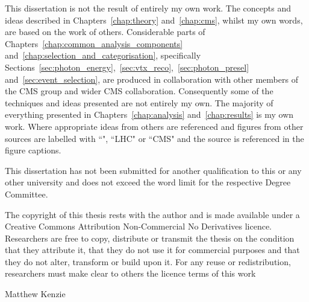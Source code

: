 \begin{declaration}
  This dissertation is not the result of entirely my own work. The concepts and ideas described in Chapters~\ref{chap:theory} and~\ref{chap:cms}, whilst my own words, are based on the work of others. Considerable parts of Chapters~\ref{chap:common_analysis_components} and~\ref{chap:selection_and_categorisation}, specifically Sections~\ref{sec:photon_energy},~\ref{sec:vtx_reco},~\ref{sec:photon_presel} and~\ref{sec:event_selection}, are produced in collaboration with other members of the \acs{CMS} \Hgg group and wider \acs{CMS} collaboration. Consequently some of the techniques and ideas presented are not entirely my own. The majority of everything presented in Chapters~\ref{chap:analysis} and~\ref{chap:results} is my own work. Where appropriate ideas from others are referenced and figures from other sources are labelled with ``\Hgg", ``LHC" or ``CMS" and the source is referenced in the figure captions.

  This dissertation has not been submitted for another qualification to this or any other university and does not exceed the word limit for the respective Degree Committee.

The copyright of this thesis rests with the author and is made available under a Creative Commons Attribution Non-Commercial No Derivatives licence. Researchers are free to copy, distribute or transmit the thesis on the condition that they attribute it, that they do not use it for commercial purposes and that they do not alter, transform or build upon it. For any reuse or redistribution, researchers must make clear to others the licence terms of this work

  \vspace*{1cm}
  \begin{flushright}
    Matthew Kenzie
  \end{flushright}
\end{declaration}


